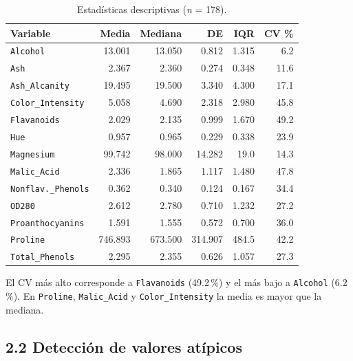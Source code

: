 \documentclass[10pt,letterpaper,twocolumn]{article}
\newcommand{\var}[1]{\texttt{#1}}
\begin{document}
\begin{table}[htbp]
  \centering
  \caption{Estadísticas descriptivas (\textit{n} = 178).}
  \label{tab:descriptiva}
  \footnotesize
  \setlength{\tabcolsep}{3.5pt}
  \begin{tabular}{@{}lrrrrr@{}}
    \toprule
    \textbf{Variable} & \textbf{Media} & \textbf{Mediana} & \textbf{DE} & \textbf{IQR} & \textbf{CV \%} \\
    \midrule
    \var{Alcohol}              & 13.001  & 13.050  & 0.812   & 1.315 & 6.2 \\
    \var{Ash}                  & 2.367   & 2.360   & 0.274   & 0.348 & 11.6 \\
    \var{Ash\_Alcanity}        & 19.495  & 19.500  & 3.340   & 4.300 & 17.1 \\
    \var{Color\_Intensity}     & 5.058   & 4.690   & 2.318   & 2.980 & 45.8 \\
    \var{Flavanoids}           & 2.029   & 2.135   & 0.999   & 1.670 & 49.2 \\
    \var{Hue}                  & 0.957   & 0.965   & 0.229   & 0.338 & 23.9 \\
    \var{Magnesium}            & 99.742  & 98.000  & 14.282  & 19.0  & 14.3 \\
    \var{Malic\_Acid}          & 2.336   & 1.865   & 1.117   & 1.480 & 47.8 \\
    \var{Nonflav.\_Phenols}    & 0.362   & 0.340   & 0.124   & 0.167 & 34.4 \\
    \var{OD280}                & 2.612   & 2.780   & 0.710   & 1.232 & 27.2 \\
    \var{Proanthocyanins}      & 1.591   & 1.555   & 0.572   & 0.700 & 36.0 \\
    \var{Proline}              & 746.893 & 673.500 & 314.907 & 484.5 & 42.2 \\
    \var{Total\_Phenols}       & 2.295   & 2.355   & 0.626   & 1.057 & 27.3 \\
    \bottomrule
  \end{tabular}
\end{table}

El CV más alto corresponde a \var{Flavanoids} (49.2\,\%) y el más bajo a \var{Alcohol} (6.2\,\%). En \var{Proline}, \var{Malic\_Acid} y \var{Color\_Intensity} la media es mayor que la mediana.

\subsection{2.2 Detección de valores atípicos}
\end{document}

